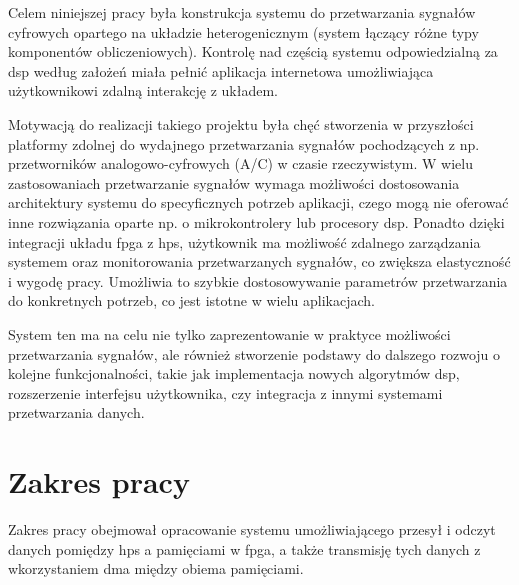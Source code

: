 Celem niniejszej pracy była konstrukcja systemu do przetwarzania sygnałów cyfrowych opartego na układzie heterogenicznym (system łączący różne typy komponentów obliczeniowych). Kontrolę nad częścią systemu odpowiedzialną za \ac{dsp} według założeń miała pełnić aplikacja internetowa
umożliwiająca użytkownikowi zdalną interakcję z układem.

Motywacją do realizacji takiego projektu była chęć stworzenia w przyszłości platformy zdolnej do wydajnego przetwarzania sygnałów pochodzących z np. przetworników analogowo-cyfrowych (A/C) w czasie rzeczywistym. W wielu zastosowaniach przetwarzanie sygnałów
wymaga możliwości dostosowania architektury systemu do specyficznych potrzeb aplikacji, czego mogą nie oferować inne rozwiązania oparte np. o mikrokontrolery lub procesory \ac{dsp}. Ponadto dzięki integracji  układu \ac{fpga} z \ac{hps}, użytkownik ma możliwość zdalnego zarządzania
systemem oraz monitorowania przetwarzanych sygnałów, co zwiększa elastyczność i wygodę pracy. Umożliwia to szybkie dostosowywanie parametrów przetwarzania do konkretnych potrzeb, co jest istotne w wielu aplikacjach.

System ten ma na celu nie tylko zaprezentowanie w praktyce możliwości przetwarzania sygnałów, ale również stworzenie podstawy do dalszego rozwoju o kolejne funkcjonalności, takie jak implementacja nowych algorytmów \ac{dsp}, rozszerzenie interfejsu użytkownika,
czy integracja z innymi systemami przetwarzania danych.

\section*{Zakres pracy}
\label{sec:zakresPracy}
Zakres pracy obejmował opracowanie systemu umożliwiającego przesył i odczyt danych pomiędzy \ac{hps} a pamięciami w \ac{fpga}, a także transmisję tych danych z wkorzystaniem \ac{dma} między obiema pamięciami.

